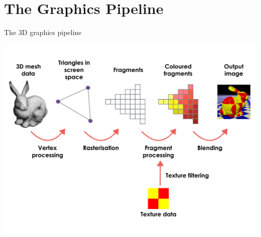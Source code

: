 \part{The Graphics Pipeline}
\frame{\partpage}

\begin{frame}{The 3D graphics pipeline}
\begin{center}
	\includegraphics[height=0.7\textheight]{pipeline}
\end{center}
\end{frame}

